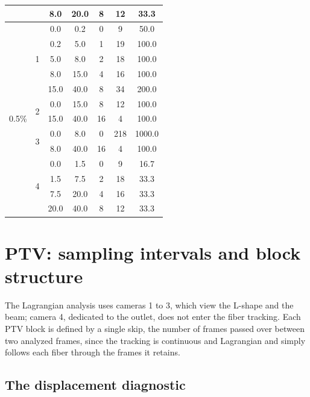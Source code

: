\documentclass[%
  aip,
  pof,
  reprint,
  floatfix
]{revtex4-2}
\begin{document}
\begin{table}[htb]
\begin{tabular}{l c c c c c c}
 &                    &  8.0 & 20.0 & 8 & 12 &  33.3 \\
\midrule
\multirow{13}{*}{0.5\%}
 & \multirow{5}{*}{1} &  0.0 &  0.2 & 0 &  9 &  50.0 \\
 &                    &  0.2 &  5.0 & 1 & 19 & 100.0 \\
 &                    &  5.0 &  8.0 & 2 & 18 & 100.0 \\
 &                    &  8.0 & 15.0 & 4 & 16 & 100.0 \\
 &                    & 15.0 & 40.0 & 8 & 34 & 200.0 \\
\cmidrule(lr){2-7}
 & \multirow{2}{*}{2} &  0.0 & 15.0 &  8 & 12 & 100.0 \\
 &                    & 15.0 & 40.0 & 16 &  4 & 100.0 \\
\cmidrule(lr){2-7}
 & \multirow{2}{*}{3} &  0.0 &  8.0 &  0 & 218 & 1000.0 \\
 &                    &  8.0 & 40.0 & 16 &   4 &  100.0 \\
\cmidrule(lr){2-7}
 & \multirow{4}{*}{4} &  0.0 &  1.5 & 0 &  9 &  16.7 \\
 &                    &  1.5 &  7.5 & 2 & 18 &  33.3 \\
 &                    &  7.5 & 20.0 & 4 & 16 &  33.3 \\
 &                    & 20.0 & 40.0 & 8 & 12 &  33.3 \\
\bottomrule
\end{tabular}
\end{table}


\section{PTV: sampling intervals and block structure}
\label{sup:ptv}

The Lagrangian analysis uses cameras 1 to 3, which view the L-shape and the beam; camera 4, dedicated to the outlet, does not enter the fiber tracking. Each PTV block is defined by a single skip, the number of frames passed over between two analyzed frames, since the tracking is continuous and Lagrangian and simply follows each fiber through the frames it retains.

\subsection{The displacement diagnostic}
\end{document}
